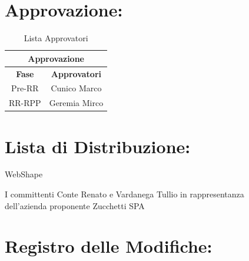 \newpage
\section*{\LARGE Approvazione:}
\begin{table}[!h]
	\begin{center}
		\begin{tabular}
			{|c|c|}
			\hline
			\multicolumn{2}{|c|}{ \textbf{Approvazione} } \\
			\hline
			\textbf{Fase} & \textbf{Approvatori} \\
			\hline
			\multirow{1}{*}{Pre-RR}  &  Cunico Marco\\
			\hline
			\multirow{1}{*}{RR-RPP} & Geremia Mirco\\
			\hline
		\end{tabular}
		\caption{Lista Approvatori} %
		\label{tabapprovazione}
	\end{center}
\end{table}

\textbf{}

\section*{\LARGE Lista di Distribuzione:}

	\begin{elenconumerato}{\normindent}
		\item WebShape
		\item I committenti Conte Renato e Vardanega Tullio in rappresentanza \\  dell'azienda proponente Zucchetti SPA
	\end{elenconumerato}

\newpage

\section*{\LARGE Registro delle Modifiche:}

